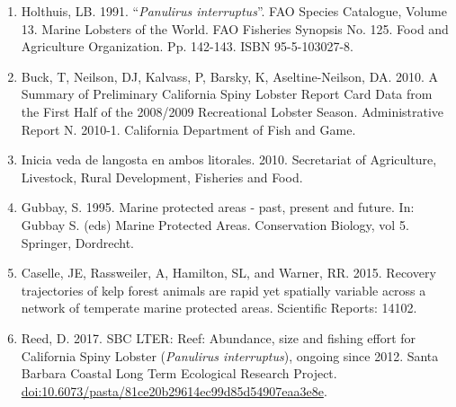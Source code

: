 \documentclass[]{article}
\begin{document}
\begin{enumerate}
\def\labelenumi{\arabic{enumi}.}
\item
  Holthuis, LB. 1991. ``\emph{Panulirus interruptus}''. FAO Species
  Catalogue, Volume 13. Marine Lobsters of the World. FAO Fisheries
  Synopsis No. 125. Food and Agriculture Organization. Pp. 142-143. ISBN
  95-5-103027-8.
\item
  Buck, T, Neilson, DJ, Kalvass, P, Barsky, K, Aseltine-Neilson, DA.
  2010. A Summary of Preliminary California Spiny Lobster Report Card
  Data from the First Half of the 2008/2009 Recreational Lobster Season.
  Administrative Report N. 2010-1. California Department of Fish and
  Game.
\item
  Inicia veda de langosta en ambos litorales. 2010. Secretariat of
  Agriculture, Livestock, Rural Development, Fisheries and Food.
\item
  Gubbay, S. 1995. Marine protected areas - past, present and future.
  In: Gubbay S. (eds) Marine Protected Areas. Conservation Biology, vol
  5. Springer, Dordrecht.
\item
  Caselle, JE, Rassweiler, A, Hamilton, SL, and Warner, RR. 2015.
  Recovery trajectories of kelp forest animals are rapid yet spatially
  variable across a network of temperate marine protected areas.
  Scientific Reports: 14102.
\item
  Reed, D. 2017. SBC LTER: Reef: Abundance, size and fishing effort for
  California Spiny Lobster (\emph{Panulirus interruptus}), ongoing since
  2012. Santa Barbara Coastal Long Term Ecological Research Project.
  \url{doi:10.6073/pasta/81ce20b29614ec99d85d54907eaa3e8e}.
\end{enumerate}
\end{document}
